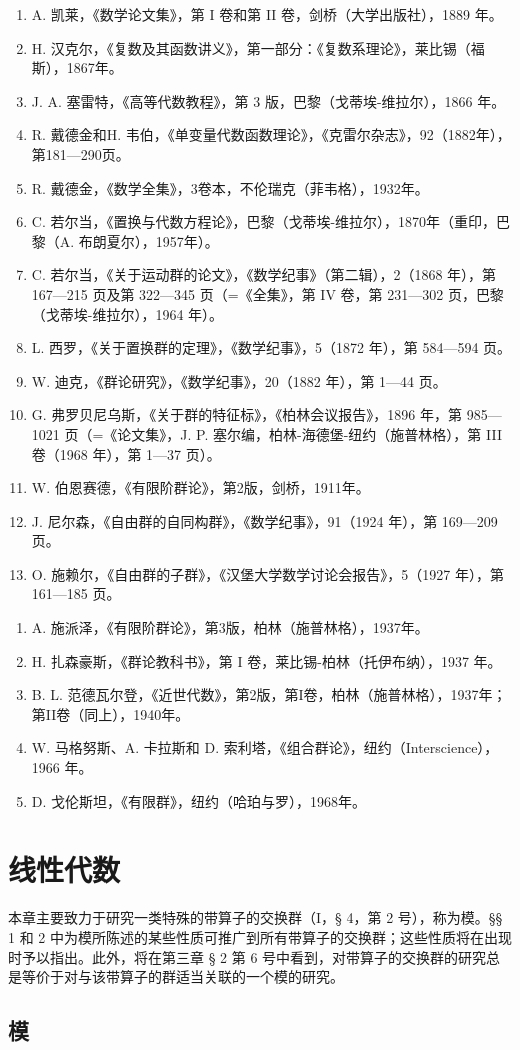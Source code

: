 \begin{enumerate}
\def\labelenumi{\arabic{enumi}.}
\setcounter{enumi}{9}
\item
  A. 凯莱，《数学论文集》，第 I 卷和第 II 卷，剑桥（大学出版社），1889 年。
\item
  H. 汉克尔，《复数及其函数讲义》，第一部分：《复数系理论》，莱比锡（福斯），1867年。
\item
  J. A. 塞雷特，《高等代数教程》，第 3 版，巴黎（戈蒂埃-维拉尔），1866 年。
\item
  R. 戴德金和H. 韦伯，《单变量代数函数理论》，《克雷尔杂志》，92（1882年），第181—290页。
\item
  R. 戴德金，《数学全集》，3卷本，不伦瑞克（菲韦格），1932年。
\item
  C. 若尔当，《置换与代数方程论》，巴黎（戈蒂埃-维拉尔），1870年（重印，巴黎（A. 布朗夏尔），1957年）。
\item
  C. 若尔当，《关于运动群的论文》，《数学纪事》（第二辑），2（1868 年），第 167—215 页及第 322—345 页（=《全集》，第 IV 卷，第 231—302 页，巴黎（戈蒂埃-维拉尔），1964 年）。
\item
  L. 西罗，《关于置换群的定理》，《数学纪事》，5（1872 年），第 584—594 页。
\item
  W. 迪克，《群论研究》，《数学纪事》，20（1882 年），第 1—44 页。
\item
  G. 弗罗贝尼乌斯，《关于群的特征标》，《柏林会议报告》，1896 年，第 985—1021 页（=《论文集》，J. P. 塞尔编，柏林-海德堡-纽约（施普林格），第 III 卷（1968 年），第 1—37 页）。
\item
  W. 伯恩赛德，《有限阶群论》，第2版，剑桥，1911年。
\item
  J. 尼尔森，《自由群的自同构群》，《数学纪事》，91（1924 年），第 169—209 页。
\item
  O. 施赖尔，《自由群的子群》，《汉堡大学数学讨论会报告》，5（1927 年），第 161—185 页。
\end{enumerate}

\begin{enumerate}
\def\labelenumi{\arabic{enumi}.}
\setcounter{enumi}{22}
\item
  A. 施派泽，《有限阶群论》，第3版，柏林（施普林格），1937年。
\item
  H. 扎森豪斯，《群论教科书》，第 I 卷，莱比锡-柏林（托伊布纳），1937 年。
\item
  B. L. 范德瓦尔登，《近世代数》，第2版，第I卷，柏林（施普林格），1937年；第II卷（同上），1940年。
\item
  W. 马格努斯、A. 卡拉斯和 D. 索利塔，《组合群论》，纽约（Interscience），1966 年。
\item
  D. 戈伦斯坦，《有限群》，纽约（哈珀与罗），1968年。
\end{enumerate}

\chapter{线性代数}

本章主要致力于研究一类特殊的带算子的交换群（I，§ 4，第 2 号），称为模。§§ 1 和 2 中为模所陈述的某些性质可推广到所有带算子的交换群；这些性质将在出现时予以指出。此外，将在第三章 § 2 第 6 号中看到，对带算子的交换群的研究总是等价于对与该带算子的群适当关联的一个模的研究。

\section{模}
